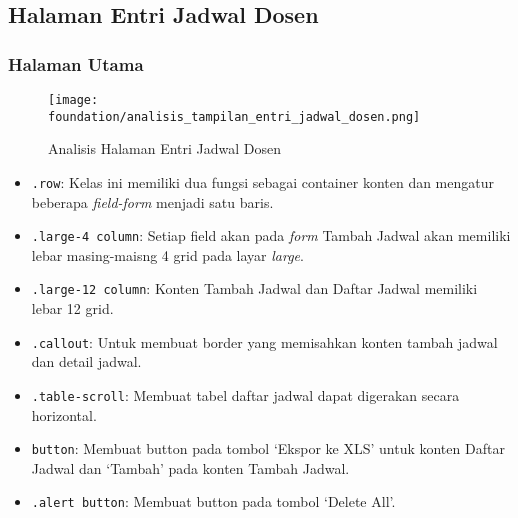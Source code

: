 \subsection{Halaman Entri Jadwal Dosen}
\subsubsection{Halaman Utama}

\begin{figure} [H]
\centering  
\texttt{[image: foundation/analisis\_tampilan\_entri\_jadwal\_dosen.png]}
\caption{Analisis Halaman Entri Jadwal Dosen}
\end{figure}
\begin{itemize}
	\item \texttt{.row}: Kelas ini memiliki dua fungsi sebagai container konten dan mengatur beberapa \textit{field-form} menjadi satu baris. 
	\item \texttt{.large-4 column}: Setiap field akan pada \textit{form} Tambah Jadwal akan memiliki lebar masing-maisng 4 grid pada layar \textit{large}.
	\item \texttt{.large-12 column}: Konten Tambah Jadwal dan Daftar Jadwal memiliki lebar 12 grid.
	\item \texttt{.callout}: Untuk membuat border yang memisahkan konten tambah jadwal dan detail jadwal.
	\item \texttt{.table-scroll}: Membuat tabel daftar jadwal dapat digerakan secara horizontal.
	\item \texttt{button}: Membuat button pada tombol `Ekspor ke XLS' untuk konten Daftar Jadwal dan `Tambah' pada konten Tambah Jadwal.
	\item \texttt{.alert button}: Membuat button pada tombol `Delete All'.
	
\end{itemize}
